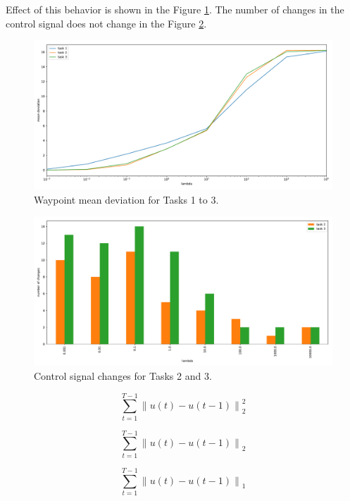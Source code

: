 Effect of this behavior is shown in the Figure \ref{fig:task4:waypoint:dev}. The number of changes in the control signal does not change in the Figure \ref{fig:task4:changes}.

\begin{figure}[!htb]
    \centering
    \includegraphics[width=\linewidth]{part1/notebooks/task_1_2_3_waypoint_mean_dev.pdf}
    \caption{Waypoint mean deviation for Tasks 1 to 3.}
    \label{fig:task4:waypoint:dev}
\end{figure}

\begin{figure}[!htb]
    \centering
    \includegraphics[width=\linewidth]{part1/notebooks/task_2_3_signal_changes.pdf}
    \caption{Control signal changes for Tasks 2 and 3.}
    \label{fig:task4:changes}
\end{figure}

\noindent
\begin{minipage}{.33\linewidth}
    \begin{equation}
        \label{task1:regularizer}
        \sum_{t = 1}^{T-1} \left\| u(t) - u(t-1) \right\|_2^2
    \end{equation}
\end{minipage}
\begin{minipage}{.33\linewidth}
    \begin{equation}
        \label{task2:regularizer}
        \sum_{t = 1}^{T-1} \left\| u(t) - u(t-1) \right\|_2
    \end{equation}
\end{minipage}
\begin{minipage}{.33\linewidth}
    \begin{equation}
        \label{task3:regularizer}
        \sum_{t = 1}^{T-1} \left\| u(t) - u(t-1) \right\|_1
    \end{equation}
\end{minipage}


